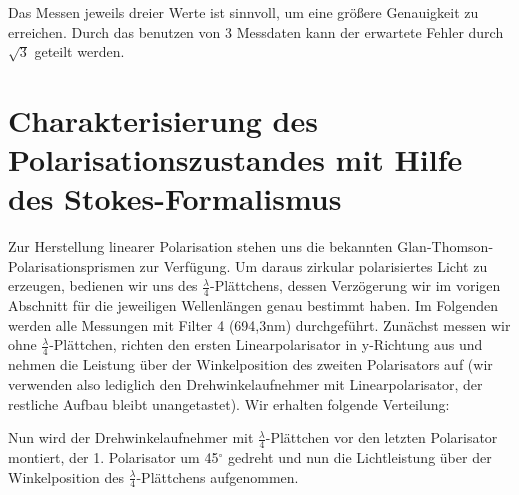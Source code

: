 \documentclass[bigchapter,colorback,accentcolor=tud4b,linedtoc,11pt]{tudreport}
\begin{document}
Das Messen jeweils dreier Werte ist sinnvoll, um eine größere Genauigkeit zu erreichen. Durch das benutzen von 3 Messdaten kann der erwartete Fehler durch $\sqrt{3}$ geteilt werden.
\section{Charakterisierung des Polarisationszustandes mit Hilfe des Stokes-Formalismus}
Zur Herstellung linearer Polarisation stehen uns die bekannten Glan-Thomson-Polarisationsprismen zur Verfügung. Um daraus zirkular polarisiertes Licht zu erzeugen, bedienen wir uns des $\frac{\lambda}{4}$-Plättchens, dessen Verzögerung wir im vorigen Abschnitt für die jeweiligen Wellenlängen genau bestimmt haben. Im Folgenden werden alle Messungen mit Filter 4 (694,3nm) durchgeführt. Zunächst messen wir ohne $\frac{\lambda}{4}$-Plättchen, richten den ersten Linearpolarisator in y-Richtung aus und nehmen die Leistung über der Winkelposition des zweiten Polarisators auf (wir verwenden also lediglich den Drehwinkelaufnehmer mit Linearpolarisator, der restliche Aufbau bleibt unangetastet). Wir erhalten folgende Verteilung:

\begin{center}
\begin{figure}[H]
\end{figure}
\end{center}

Nun wird der Drehwinkelaufnehmer mit $\frac{\lambda}{4}$-Plättchen vor den letzten Polarisator montiert, der 1. Polarisator um 45$^\circ$ gedreht und nun die Lichtleistung über der Winkelposition des $\frac{\lambda}{4}$-Plättchens aufgenommen. 
\end{document}
